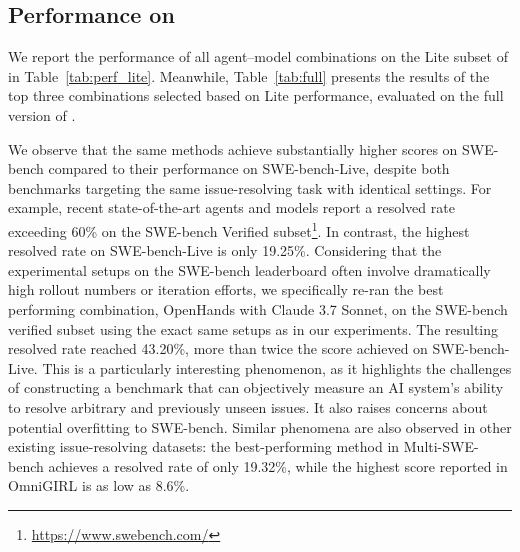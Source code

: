 \subsection{Performance on \benchmark}
We report the performance of all agent–model combinations on the Lite subset of \benchmark{} in Table~\ref{tab:perf_lite}. 
Meanwhile, Table~\ref{tab:full} presents the results of the top three combinations selected based on Lite performance, evaluated on the full version of \benchmark{}.




We observe that the same methods achieve substantially higher scores on SWE-bench compared to their performance on SWE-bench-Live, despite both benchmarks targeting the same issue-resolving task with identical settings. For example, recent state-of-the-art agents and models report a resolved rate exceeding 60\% on the SWE-bench Verified subset\footnote{\url{https://www.swebench.com/}}. In contrast, the highest resolved rate on SWE-bench-Live is only 19.25\%. 
Considering that the experimental setups on the SWE-bench leaderboard often involve dramatically high rollout numbers or iteration efforts, we specifically re-ran the best performing combination, OpenHands with Claude 3.7 Sonnet, on the SWE-bench verified subset using the exact same setups as in our experiments.
The resulting resolved rate reached 43.20\%, more than twice the score achieved on SWE-bench-Live. This is a particularly interesting phenomenon, as it highlights the challenges of constructing a benchmark that can objectively measure an AI system’s ability to resolve arbitrary and previously unseen issues. It also raises concerns about potential overfitting to SWE-bench. Similar phenomena are also observed in other existing issue-resolving datasets: the best-performing method in Multi-SWE-bench achieves a resolved rate of only 19.32\%, while the highest score reported in OmniGIRL is as low as 8.6\%.

